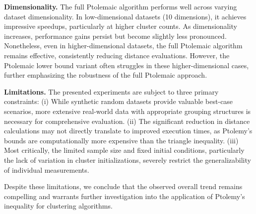 \textbf{Dimensionality.} The full Ptolemaic algorithm performs well across varying dataset dimensionality. In low-dimensional datasets (10 dimensions), it achieves impressive speedups, particularly at higher cluster counts.
As dimensionality increases, performance gains persist but become slightly less pronounced.
Nonetheless, even in higher-dimensional datasets, the full Ptolemaic algorithm remains effective, consistently reducing distance evaluations.
However, the Ptolemaic lower bound variant often struggles in these higher-dimensional cases, further emphasizing the robustness of the full Ptolemaic approach.



\textbf{Limitations.}
The presented experiments are subject to three primary constraints:
(i) While synthetic random datasets provide valuable best-case scenarios, more extensive real-world data with appropriate grouping structures is necessary for comprehensive evaluation.
(ii) The significant reduction in distance calculations may not directly translate to improved execution times, as Ptolemy's bounds are computationally more expensive than the triangle inequality.
(iii) Most critically, the limited sample size and fixed initial conditions, particularly the lack of variation in cluster initializations, severely restrict the generalizability of individual measurements.

Despite these limitations, we conclude that the observed overall trend remains compelling and warrants further investigation into the application of Ptolemy's inequality for clustering algorithms.


